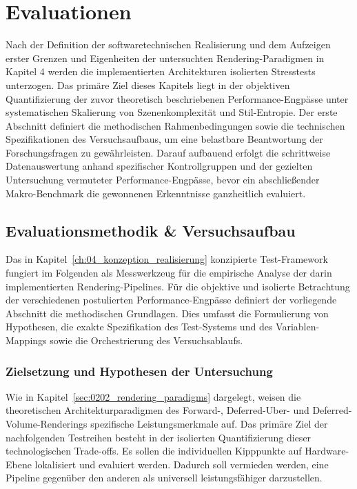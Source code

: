 \chapter{Evaluationen}
\label{ch:05_evaluation}

Nach der Definition der softwaretechnischen Realisierung und dem Aufzeigen erster Grenzen und Eigenheiten der
untersuchten Rendering-Paradigmen in Kapitel 4 werden die implementierten Architekturen isolierten Stresstests
unterzogen.
Das primäre Ziel dieses Kapitels liegt in der objektiven Quantifizierung der zuvor theoretisch beschriebenen
Performance-Engpässe unter systematischen Skalierung von Szenenkomplexität und Stil-Entropie.
Der erste Abschnitt definiert die methodischen Rahmenbedingungen sowie die technischen Spezifikationen des
Versuchsaufbaus, um eine belastbare Beantwortung der Forschungsfragen zu gewährleisten.
Darauf aufbauend erfolgt die schrittweise Datenauswertung anhand spezifischer Kontrollgruppen und der gezielten
Untersuchung vermuteter Performance-Engpässe, bevor ein abschließender Makro-Benchmark die gewonnenen Erkenntnisse
ganzheitlich evaluiert.


\section{Evaluationsmethodik \& Versuchsaufbau}
\label{sec:0501_evaluation_methodology}

Das in Kapitel~\ref{ch:04_konzeption_realisierung} konzipierte Test-Framework fungiert im Folgenden als Messwerkzeug für die empirische Analyse der darin
implementierten Rendering-Pipelines.
Für die objektive und isolierte Betrachtung der verschiedenen postulierten Performance-Engpässe definiert der
vorliegende Abschnitt die methodischen Grundlagen.
Dies umfasst die Formulierung von Hypothesen, die exakte Spezifikation des Test-Systems und des
Variablen-Mappings sowie die Orchestrierung des Versuchsablaufs.

\subsection{Zielsetzung und Hypothesen der Untersuchung}
\label{subsec:050101_evaluation_tagets_and_hypothesis}

Wie in Kapitel~\ref{sec:0202_rendering_paradigms} dargelegt, weisen die theoretischen Architekturparadigmen des
Forward-, Deferred-Uber- und Deferred-Volume-Renderings spezifische Leistungsmerkmale auf.
Das primäre Ziel der nachfolgenden Testreihen besteht in der isolierten Quantifizierung dieser technologischen
Trade-offs.
Es sollen die individuellen Kipppunkte auf Hardware-Ebene lokalisiert und evaluiert werden.
Dadurch soll vermieden werden, eine Pipeline gegenüber den anderen als universell leistungsfähiger darzustellen.

